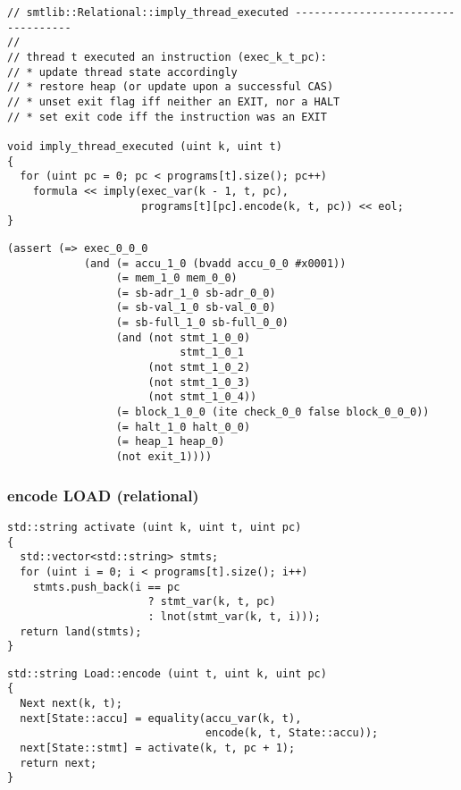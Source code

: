 \begin{lstlisting}[style=c++]
// smtlib::Relational::imply_thread_executed -----------------------------------
//
// thread t executed an instruction (exec_k_t_pc):
// * update thread state accordingly
// * restore heap (or update upon a successful CAS)
// * unset exit flag iff neither an EXIT, nor a HALT
// * set exit code iff the instruction was an EXIT

void imply_thread_executed (uint k, uint t)
{
  for (uint pc = 0; pc < programs[t].size(); pc++)
    formula << imply(exec_var(k - 1, t, pc),
                     programs[t][pc].encode(k, t, pc)) << eol;
}
\end{lstlisting}

\begin{lstlisting}[language=SMTLib]
(assert (=> exec_0_0_0
            (and (= accu_1_0 (bvadd accu_0_0 #x0001))
                 (= mem_1_0 mem_0_0)
                 (= sb-adr_1_0 sb-adr_0_0)
                 (= sb-val_1_0 sb-val_0_0)
                 (= sb-full_1_0 sb-full_0_0)
                 (and (not stmt_1_0_0)
                           stmt_1_0_1
                      (not stmt_1_0_2)
                      (not stmt_1_0_3)
                      (not stmt_1_0_4))
                 (= block_1_0_0 (ite check_0_0 false block_0_0_0))
                 (= halt_1_0 halt_0_0)
                 (= heap_1 heap_0)
                 (not exit_1))))
\end{lstlisting}

\subsubsection{encode LOAD (relational)}

\begin{lstlisting}[style=c++]
std::string activate (uint k, uint t, uint pc)
{
  std::vector<std::string> stmts;
  for (uint i = 0; i < programs[t].size(); i++)
    stmts.push_back(i == pc
                      ? stmt_var(k, t, pc)
                      : lnot(stmt_var(k, t, i)));
  return land(stmts);
}
\end{lstlisting}

\begin{lstlisting}[style=c++]
std::string Load::encode (uint t, uint k, uint pc)
{
  Next next(k, t);
  next[State::accu] = equality(accu_var(k, t),
                               encode(k, t, State::accu));
  next[State::stmt] = activate(k, t, pc + 1);
  return next;
}
\end{lstlisting}

